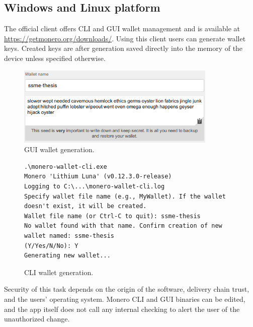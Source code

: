 \documentclass[
  printed, %
  table,   %
  lof,     %
  lot,     %
           oneside, color
]{fithesis3}
\begin{document}
\subsection{Windows and Linux platform}
The official client offers CLI and GUI wallet management and is available at \url{https://getmonero.org/downloads/}. Using this client users can generate wallet keys. Created keys are after generation saved directly into the memory of the device unless specified otherwise. 
\begin{figure}[H]
\begin{center}
 \includegraphics[trim={0 0 0 0},clip,width=0.85\textwidth]{Screenshot_4.png}
    \caption{GUI wallet generation.}
    \label{pic:guigenerator}
\end{center}
    \end{figure}

\begin{figure}[H]
\begin{center}
\begin{lstlisting}
.\monero-wallet-cli.exe
Monero 'Lithium Luna' (v0.12.3.0-release)
Logging to C:\...\monero-wallet-cli.log
Specify wallet file name (e.g., MyWallet). If the wallet 
doesn't exist, it will be created.
Wallet file name (or Ctrl-C to quit): ssme-thesis
No wallet found with that name. Confirm creation of new 
wallet named: ssme-thesis
(Y/Yes/N/No): Y
Generating new wallet...
\end{lstlisting}
\caption{CLI wallet generation.}
    \label{pic:cligenerator}
\end{center}
    \end{figure}
    \vspace{-1em}
Security of this task depends on the origin of the software, delivery chain trust, and the users' operating system. Monero CLI and GUI binaries can be edited, and the app itself does not call any internal checking to alert the user of the unauthorized change. 
\end{document}
